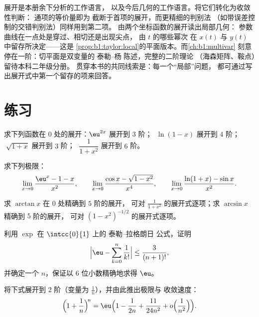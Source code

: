 \begin{remark}[本册内的展望]
展开是本册余下分析的工作语言，
以及今后几何的工作语言。将它们转化为收敛性判断：
通项的等价量即为
截断于首项的展开，而更精细的判别法
（如带误差控制的交错判别法）同样用到第二项。
由两个坐标函数的展开读出局部几何：
参数曲线在一点处是穿过、相切还是出现尖点，
由 $t$ 的哪些幂次
在 $x(t)$ 与 $y(t)$ 中留存所决定——这是
\cref{prop:b1:taylor:local}的平面版本。而\cref{ch:b1:multivar}
刻意停在一阶：切平面是双变量的
泰勒–杨 陈述，完整的二阶理论
（海森矩阵、鞍点）留待本科二年级分册。
贯穿本书的共同线索是：每一个“局部”问题，
都可通过写出展开式中第一个留存的项来回答。
\end{remark}

\section{练习}

\begin{exercise}[$\star$]\label{exo:b1:taylor:1}
求下列函数在 $0$ 处的展开：$\eu^{2x}$ 展开到 $3$ 阶；
$\;\ln(1 - x)$ 展开到 $4$ 阶；$\;\sqrt{1 + x}$ 展开到 $3$ 阶；
$\;\dfrac{1}{1 + x^2}$ 展开到 $6$ 阶。
\end{exercise}

\begin{exercise}[$\star$]\label{exo:b1:taylor:2}
求下列极限：
\[
\lim_{x\to 0} \frac{\eu^x - 1 - x}{x^2},
\qquad
\lim_{x\to 0} \frac{\cos x - \sqrt{1 - x^2}}{x^4},
\qquad
\lim_{x\to 0} \frac{\ln(1+x) - \sin x}{x^2}.
\]
\end{exercise}

\begin{exercise}[$\star$]\label{exo:b1:taylor:3}
求 $\arctan x$ 在 $0$ 处精确到 $5$ 阶的展开，
可对 $\frac{1}{1 + x^2}$ 的展开式逐项；求 $\arcsin x$ 精确到 $5$ 阶的展开，
可对 $(1 - x^2)^{-1/2}$ 的展开式逐项。
\end{exercise}

\begin{exercise}[$\star$]\label{exo:b1:taylor:4}
利用 $\exp$ 在 $\intcc{0}{1}$ 上的 泰勒–拉格朗日 公式，证明
\[
\Bigl| \eu - \sum_{k=0}^{n} \frac{1}{k!} \Bigr| \leq
\frac{3}{(n+1)!},
\]
并确定一个 $n$，保证以 $6$ 位小数精确地求得 $\eu$。
\end{exercise}

\begin{exercise}[$\star\star$]\label{exo:b1:taylor:5}
将下式展开到 $2$ 阶（变量为 $\frac1n$），并由此推出极限与
收敛速度：
\[
\Bigl(1 + \frac 1n\Bigr)^{\!n}
= \eu\Bigl(1 - \frac{1}{2n} + \frac{11}{24n^2} +
o\Bigl(\frac{1}{n^2}\Bigr)\Bigr).
\]
\end{exercise}

